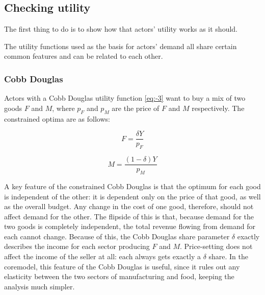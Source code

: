 \subsection{Checking utility \label{sec:checkutility}}

The first thing to do is to show how that actors' utility works as it should. 

The utility functions used as the basis for actors' demand all share certain common features and can be related to each other. 

\subsubsection{Cobb Douglas}

Actors with a Cobb Douglas utility function \eqref{eq:-3} want to buy a mix of two goods $F$ and $M$, where $p_F$ and $p_M$ are the price of $F$ and $M$ respectively. The constrained optima are as follows:

\begin{equation}
F=\frac{\delta Y}{p_F}\label{eq:optCDF}
\end{equation}
 
\begin{equation}
M=\frac{(1-\delta) Y}{p_M}\label{eq:optCDM}
\end{equation}

A key feature of the constrained Cobb Douglas is that the optimum for each good is independent of the other: it is dependent only on the price of that good, as well as the overall budget. Any change in the cost of one good, therefore, should not affect demand for the other. The flipside of this is that, because demand for the two goods is completely independent, the total revenue flowing from demand for each cannot change. Because of this, the Cobb Douglas share parameter $\delta$ exactly describes the income for each sector producing $F$ and $M$. Price-setting does not affect the income of the seller at all: each always gets exactly a $\delta$ share. In the \gls{coremodel}, this feature of the Cobb Douglas is useful, since it rules out any elasticity between the two sectors of manufacturing and food, keeping the analysis much simpler.

